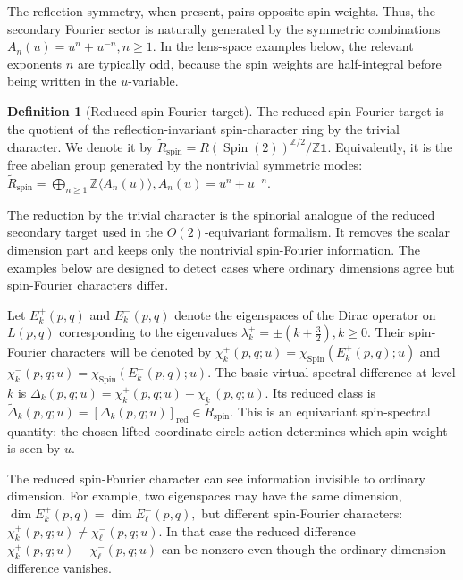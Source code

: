\documentclass{article}
\theoremstyle{definition}
\newtheorem{definition}[theorem]{Definition}
\numberwithin{equation}{section}
\begin{document}
The reflection symmetry, when present, pairs opposite spin weights.  Thus, the secondary Fourier sector is naturally generated by the symmetric combinations $A_n(u)=u^n+u^{-n}, n\geq 1.$ In the lens-space examples below, the relevant exponents $n$ are typically odd, because the spin weights are half-integral before being written in the $u$-variable.

\begin{definition}[Reduced spin-Fourier target]
The reduced spin-Fourier target is the quotient of the reflection-invariant spin-character ring by the trivial character.  We denote it by $\widetilde R_{\operatorname{spin}} = R(\operatorname{Spin}(2))^{\mathbb Z/2}/\mathbb Z\mathbf 1.$ Equivalently, it is the free abelian group generated by the nontrivial symmetric modes: $\widetilde R_{\operatorname{spin}} = \bigoplus_{n\geq 1}\mathbb Z\langle A_n(u)\rangle, A_n(u)=u^n+u^{-n}.$ \end{definition}

The reduction by the trivial character is the spinorial analogue of the reduced secondary target used in the $O(2)$-equivariant formalism.  It removes the scalar dimension part and keeps only the nontrivial spin-Fourier information. The examples below are designed to detect cases where ordinary dimensions agree but spin-Fourier characters differ.

Let $E_k^+(p,q)$ and $E_k^-(p,q)$ denote the eigenspaces of the Dirac operator on $L(p,q)$ corresponding to the eigenvalues $\lambda_k^\pm=\pm\left(k+\frac32\right), k\geq 0.$ Their spin-Fourier characters will be denoted by $\chi_k^+(p,q;u)=\chi_{\operatorname{Spin}}(E_k^+(p,q);u)$ and $\chi_k^-(p,q;u)=\chi_{\operatorname{Spin}}(E_k^-(p,q);u)$.  The basic virtual spectral difference at level $k$ is $\Delta_k(p,q;u)=\chi_k^+(p,q;u)-\chi_k^-(p,q;u)$. Its reduced class is $\widetilde\Delta_k(p,q;u)=[\Delta_k(p,q;u)]_{\operatorname{red}}\in\widetilde R_{\operatorname{spin}}$.  This is an equivariant spin-spectral quantity: the chosen lifted coordinate circle action determines which spin weight is seen by $u$.

The reduced spin-Fourier character can see information invisible to ordinary dimension.  For example, two eigenspaces may have the same dimension, $\dim E_k^+(p,q)=\dim E_\ell^-(p,q),$ but different spin-Fourier characters: $\chi_k^+(p,q;u)\neq \chi_\ell^-(p,q;u).$ In that case the reduced difference $\chi_k^+(p,q;u)-\chi_\ell^-(p,q;u)$ can be nonzero even though the ordinary dimension difference vanishes.
\end{document}
